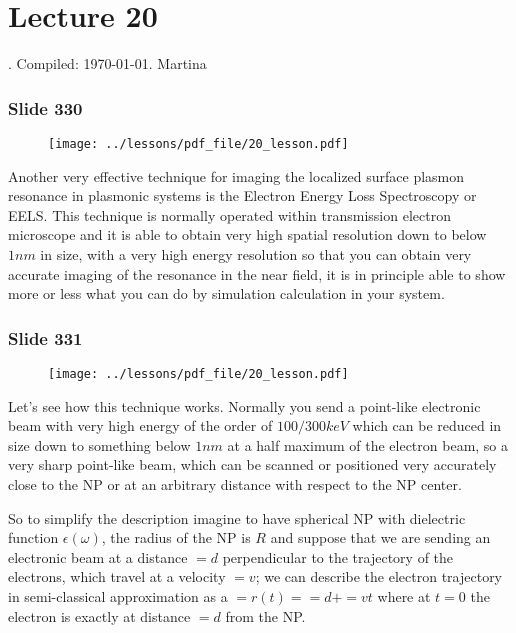 \documentclass[../main/main.tex]{subfiles}
\begin{document}
\section{Lecture 20}
 .  Compiled:  \today. Martina 
 
\subsubsection{Slide 330}

\begin{figure}[h!]
\centering
\texttt{[image: ../lessons/pdf\_file/20\_lesson.pdf]}
\end{figure}

Another very effective technique for imaging the localized surface plasmon resonance in plasmonic systems is the Electron Energy Loss Spectroscopy or EELS. This technique is normally operated within transmission electron microscope and it is able to obtain very high spatial resolution down to below $1 nm$ in size, with a very high energy resolution so that you can obtain very accurate imaging of the resonance in the near field, it is in principle able to show more or less what you can do by simulation calculation in your system.

\newpage

\subsubsection{Slide 331}

\begin{figure}[h!]
\centering
\texttt{[image: ../lessons/pdf\_file/20\_lesson.pdf]}
\end{figure}

Let's see how this technique works. Normally you send a point-like electronic beam with very high energy of the order of $100/300 keV$ which can be reduced in size down to something below $1 nm$ at a half maximum of the electron beam, so a very sharp point-like beam, which can be scanned or positioned very accurately close to the NP or at an arbitrary distance with respect to the NP center. 

So to simplify the description imagine to have spherical NP with dielectric function $\epsilon(\omega)$, the radius of the NP is $R$ and suppose that we are sending an electronic beam at a distance $=d$ perpendicular to the trajectory of the electrons, which travel at a velocity $=v$; we can describe the electron trajectory in semi-classical approximation as a $=r(t)==d+=vt$ where at $t=0$ the electron is exactly at distance $=d$ from the NP. 
\end{document}
